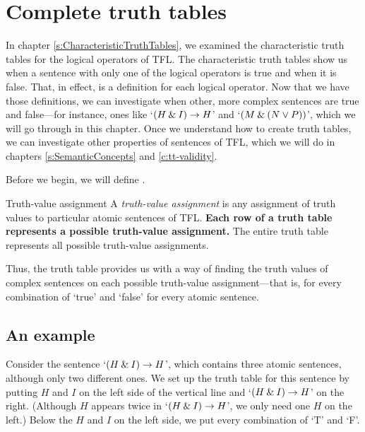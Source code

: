 

\chapter{Complete truth tables}
\label{s:CompleteTruthTables}

In chapter \ref{s:CharacteristicTruthTables}, we examined the characteristic truth tables for the logical operators of TFL. The characteristic truth tables show us when a sentence with only one of the logical operators is true and when it is false. That, in effect, is a definition for each logical operator. Now that we have those definitions, we can investigate when other, more complex sentences are true and false---for instance, ones like `$(H\mathbin{\&} I)\rightarrow H$' and `$(M \mathbin{\&} (N \vee P))$', which we will go through in this chapter. Once we understand how to create truth tables, we can investigate other properties of sentences of TFL, which we will do in chapters \ref{s:SemanticConcepts} and \ref{c:tt-validity}. 

Before we begin, we will define .

\begin{factboxy}{Truth-value assignment}
A \textit{truth-value assignment} is any assignment of truth values to particular atomic sentences of TFL. \textbf{Each row of a truth table represents a possible truth-value assignment.} The entire truth table represents all possible truth-value assignments.
\end{factboxy}

\noindent Thus, the truth table provides us with a way of finding the truth values of complex sentences on each possible truth-value assignment---that is, for every combination of `true' and `false' for every atomic sentence. 

\section{An example}\label{s:tt-example}
Consider the sentence `$(H\mathbin{\&} I)\rightarrow H$', which contains three atomic sentences, although only two different ones. We set up the truth table for this sentence by putting $H$ and $I$ on the left side of the vertical line and `$(H\mathbin{\&} I)\rightarrow H$' on the right. (Although $H$ appears twice in `$(H\mathbin{\&} I)\rightarrow H$', we only need one $H$ on the left.) Below the $H$ and $I$ on the left side, we put every combination of `T' and `F'.  

